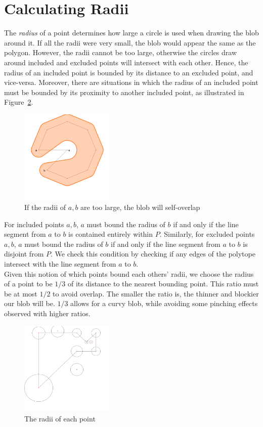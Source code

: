 \documentclass[paper=a4, fontsize=11pt]{scrartcl} %
\numberwithin{equation}{section} %
\numberwithin{figure}{section} %
\numberwithin{table}{section} %
\begin{document}
\section{Calculating Radii}
The \textit{radius} of a point determines how large a circle is used when
drawing the blob around it. If all the radii were very small, the blob would
appear the same as the polygon.  However, the radii cannot be too large,
otherwise the circles draw around included and excluded points will intersect
with each other. Hence, the radius of an included point is bounded by its
distance to an excluded point, and vice-versa. Moreover, there are situations in
which the radius of an included point must be bounded by its proximity to
another included point, as illustrated in Figure~\ref{fig:neck}. \\

\begin{figure}[h]
\includegraphics[width=0.4\textwidth]{torus_bitten}
\centering
\caption{If the radii of $a,b$ are too large, the blob will self-overlap}
\label{fig:neck}
\end{figure}

For included points $a,b$, $a$ must bound the radius of $b$ if and only if the
line segment from $a$ to $b$ is contained entirely within $P$. Similarly, for
excluded points $a,b$, $a$ must bound the radius of $b$ if and only if the line
segment from $a$ to $b$ is disjoint from $P$. We check this condition by
checking if any edges of the polytope intersect with the line segment from $a$
to $b$. \\

Given this notion of which points bound each others' radii, we choose the radius
of a point to be $1/3$ of its distance to the nearest bounding point. This
ratio must be at most $1/2$ to avoid overlap. The smaller the ratio is, the
thinner and blockier our blob will be. $1/3$ allows for a curvy blob, while
avoiding some pinching effects observed with higher ratios.

\begin{figure}[h]
\includegraphics[width=0.4\textwidth]{radii}
\centering
\caption{The radii of each point}
\label{fig:neck}
\end{figure}
\end{document}
